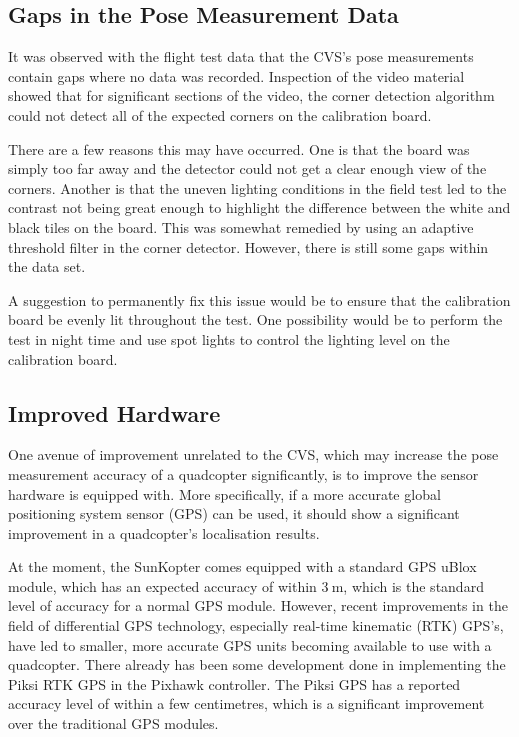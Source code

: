 \subsection{Gaps in the Pose Measurement Data}

It was observed with the flight test data that the CVS's pose measurements contain gaps where no data was recorded. Inspection of the video material showed that for significant sections of the video, the corner detection algorithm could not detect all of the expected corners on the calibration board. 

There are a few reasons this may have occurred. One is that the board was simply too far away and the detector could not get a clear enough view of the corners. Another is that the uneven lighting conditions in the field test led to the contrast not being great enough to highlight the difference between the white and black tiles on the board. This was somewhat remedied by using an adaptive threshold filter in the corner detector. However, there is still some gaps within the data set. 

A suggestion to permanently fix this issue would be to ensure that the calibration board be evenly lit throughout the test. One possibility would be to perform the test in night time and use spot lights to control the lighting level on the calibration board. 

\subsection{Improved Hardware}

One avenue of improvement unrelated to the CVS, which may increase the pose measurement accuracy of a quadcopter significantly, is to improve the sensor hardware is equipped with. More specifically, if a more accurate global positioning system sensor (GPS) can be used, it should show a significant improvement in a quadcopter's localisation results. 

At the moment, the SunKopter comes equipped with a standard GPS uBlox module, which has an expected accuracy of within $\SI{3}{\m}$, which is the standard level of accuracy for a normal GPS module. However, recent improvements in the field of differential GPS technology, especially real-time kinematic (RTK) GPS's, have led to smaller, more accurate GPS units becoming available to use with a quadcopter. There already has been some development done in implementing the Piksi RTK GPS in the Pixhawk controller. The Piksi GPS has a reported accuracy level of within a few centimetres, which is a significant improvement over the traditional GPS modules. 

